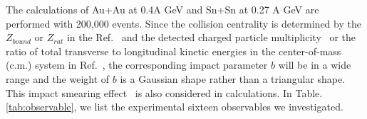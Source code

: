 \documentclass[reprint,aps,prc,twocolumn,superscriptaddress]{revtex4-1}
\begin{document}

The calculations of Au+Au at 0.4A GeV and Sn+Sn at 0.27 A GeV are performed with 200,000 events. Since the collision centrality is determined by the $Z_{bound}$ or $Z_{rat}$ in the Ref.~\cite{Russotto2016PRC} and the detected charged particle multiplicity~\cite{GJhang20} or the ratio of total transverse to longitudinal kinetic energies in the center-of-mass (c.m.) system in Ref.~\cite{FOPI2010}, the corresponding impact parameter $b$ will be in a wide range and the weight of $b$ is a Gaussian shape rather than a triangular shape. This impact smearing effect~\cite{Russotto2016PRC,Frankland2021PRC,Lili2019PRC,Lili2022arxiv} is also considered in calculations. In Table.\ref{tab:observable}, we list the experimental sixteen observables we investigated. 
\end{document}
